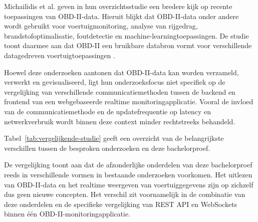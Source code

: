 Michailidis et al. geven in hun overzichtsstudie een bredere kijk op recente
toepassingen van OBD-II-data. Hieruit blijkt dat OBD-II-data onder andere wordt
gebruikt voor voertuigmonitoring, analyse van rijgedrag, brandstofoptimalisatie,
foutdetectie en machine-learningtoepassingen. De studie toont daarmee aan dat
OBD-II een bruikbare databron vormt voor verschillende datagedreven
voertuigtoepassingen \autocite{Pmc2025}.

Hoewel deze onderzoeken aantonen dat OBD-II-data kan worden verzameld,
verwerkt en gevisualiseerd, ligt hun onderzoeksfocus niet specifiek op de
vergelijking van verschillende communicatiemethoden tussen de backend en
frontend van een webgebaseerde realtime monitoringapplicatie. Vooral de invloed
van de communicatiemethode en de updatefrequentie op latency en netwerkverbruik
wordt binnen deze context minder rechtstreeks behandeld.

Tabel~\ref{tab:vergelijkende-studie} geeft een overzicht van de belangrijkste
verschillen tussen de besproken onderzoeken en deze bachelorproef.

\begin{table}[H]
    \centering
    \caption{Vergelijking van relevante onderzoeken met deze bachelorproef}
    \label{tab:vergelijkende-studie}
\end{table}

De vergelijking toont aan dat de afzonderlijke onderdelen van deze
bachelorproef reeds in verschillende vormen in bestaande onderzoeken
voorkomen. Het uitlezen van OBD-II-data en het realtime weergeven van
voertuiggegevens zijn op zichzelf dus geen nieuwe concepten. Het verschil zit
voornamelijk in de combinatie van deze onderdelen en de specifieke vergelijking
van REST API en WebSockets binnen één OBD-II-monitoringapplicatie.

